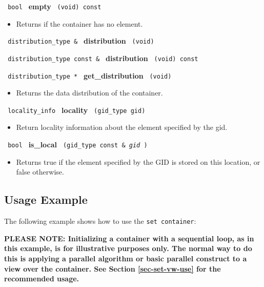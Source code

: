 \noindent
\texttt{%
bool
}
\textbf{empty}%
\texttt{%
(void) const
}

\begin{itemize}
\item
Returns if the container has no element.
\end{itemize}
 
\noindent
\texttt{%
distribution\_type \& 
}
\textbf{distribution}%
\texttt{%
 (void)
}
 
\noindent
\texttt{%
distribution\_type const \& 
}
\textbf{distribution}%
\texttt{%
 (void) const
}
 
\noindent
\texttt{%
distribution\_type *
}
\textbf{get\_distribution}%
\texttt{%
(void)
}
 
\begin{itemize}
\item
Returns the data distribution of the container.
\end{itemize}

\noindent
\texttt{%
locality\_info 
}
\textbf{locality}%
\texttt{%
 (gid\_type gid)
}

\begin{itemize}
\item
Return locality information about the element specified by the gid. 
\end{itemize}
 
\noindent
\texttt{%
bool
}
\textbf{is\_local}%
\texttt{%
(gid\_type const \&
\textit{gid}%
)
}

\begin{itemize}
\item
Returns true if the element specified by the GID is stored on this location, or false otherwise. 
\end{itemize}


\subsection{Usage Example} \label{sec-set-cont-use}

The following example shows how to use the \texttt{set container}:


\textbf{PLEASE NOTE: 
Initializing a container with a sequential loop, as in this example,
is for illustrative purposes only.
The normal way to do this is applying a parallel algorithm or 
basic parallel construct to a view over the container.  See Section
\ref{sec-set-vw-use}
for the recommended usage.
}

